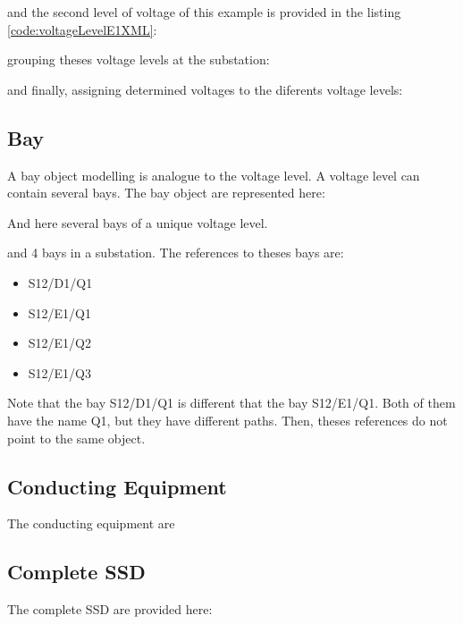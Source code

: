 	and the second level of voltage of this example is provided
	in the listing \ref{code:voltageLevelE1XML}:
	
	
	grouping theses voltage levels at the substation:
	
	
	and finally, assigning determined voltages to the 
	diferents voltage levels:
	


\subsection{Bay}
	A bay object modelling is analogue to the voltage level. 
	A voltage level can contain several bays.
	The bay object are represented here:
	
	
	And here several bays of a unique voltage level.
	
	
	and 4 bays in a substation. The references to 
	theses bays are:
	\begin{itemize}
	  \item S12/D1/Q1
	  \item S12/E1/Q1
	  \item S12/E1/Q2
	  \item S12/E1/Q3
	\end{itemize}  
	Note that the bay S12/D1/Q1 is different that the 
	bay S12/E1/Q1. Both of them have the name Q1, but 
	they have different paths. Then, theses references 
	do not point to the same object.
	

\subsection{Conducting Equipment}
The conducting equipment are 









\subsection{Complete SSD}
The complete SSD are provided here:


\\



